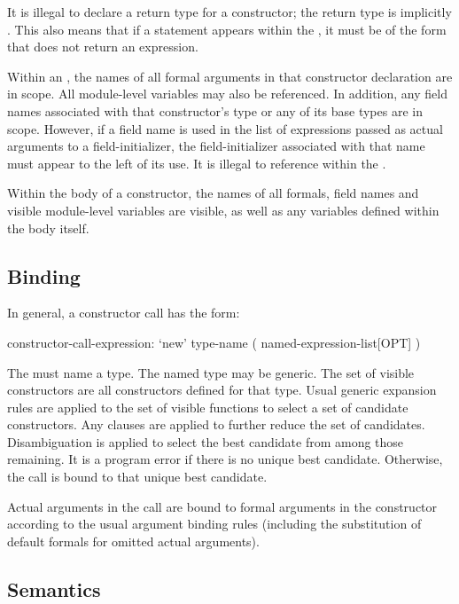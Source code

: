 It is illegal to declare a return type for a constructor; the return type is
implicitly .  This also means that if a  statement
appears within the , it must be of the form that does not
return an expression.

Within an , the names of all formal arguments in that constructor
declaration are in scope.  All module-level variables may also be referenced.  In
addition, any field names associated with that constructor's type or any of its base types
are in scope.  However, if a field name is used in the list of expressions passed as
actual arguments to a field-initializer, the field-initializer associated with that name
must appear to the left of its use.  It is illegal to reference  within the
.

Within the body of a constructor, the names of all formals, field names and visible
module-level variables are visible, as well as any variables defined within the body
itself.


\subsection{Binding}

In general, a constructor call has the form:
\begin{syntax}
constructor-call-expression:
  `new' type-name ( named-expression-list[OPT] )
\end{syntax}
The  must name a type.  The named type may be generic.
The set of visible constructors are all constructors defined for that type.  Usual
generic expansion rules are applied to the set of visible functions to select a set of
candidate constructors.  Any  clauses are applied to further reduce the set of
candidates.  Disambiguation is applied to select the best candidate from among those
remaining.  It is a program error if there is no unique best candidate.  Otherwise, the
call is bound to that unique best candidate.

Actual arguments in the call are bound to formal arguments in the constructor according to
the usual argument binding rules (including the substitution of default formals for
omitted actual arguments).

\subsection{Semantics}
\label{Constructor_Semantics}

